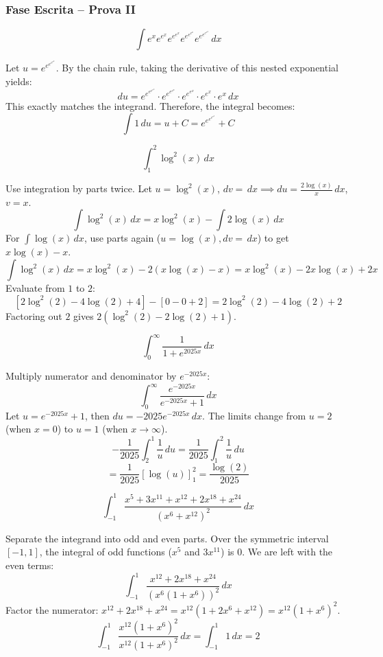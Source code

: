 \subsubsection*{Fase Escrita -- Prova II}
\begin{questions}
    \question \[\int e^x e^{e^x} e^{e^{e^x}} e^{e^{e^{e^x}}} e^{e^{e^{e^{e^x}}}} \,dx\]
    \begin{solution}
        Let $u = e^{e^{e^{e^{e^x}}}}$. By the chain rule, taking the derivative of this nested exponential yields:
        \[du = e^{e^{e^{e^{e^x}}}} \cdot e^{e^{e^{e^x}}} \cdot e^{e^{e^x}} \cdot e^{e^x} \cdot e^x \,dx\]
        This exactly matches the integrand. Therefore, the integral becomes:
        \[\int 1 \,du = u + C = e^{e^{e^{e^{e^x}}}} + C\]
    \end{solution}

    \question \[\int_1^2 \log^2(x) \,dx\]
    \begin{solution}
        Use integration by parts twice. Let $u = \log^2(x)$, $dv = \,dx \implies du = \frac{2\log(x)}{x} \,dx$, $v = x$.
        \[\int \log^2(x) \,dx = x\log^2(x) - \int 2\log(x) \,dx\]
        For $\int \log(x) \,dx$, use parts again ($u=\log(x), dv=\,dx$) to get $x\log(x) - x$.
        \[\int \log^2(x) \,dx = x\log^2(x) - 2(x\log(x) - x) = x\log^2(x) - 2x\log(x) + 2x\]
        Evaluate from $1$ to $2$:
        \[[2\log^2(2) - 4\log(2) + 4] - [0 - 0 + 2] = 2\log^2(2) - 4\log(2) + 2\]
        Factoring out $2$ gives $2(\log^2(2) - 2\log(2) + 1)$.
    \end{solution}

    \question \[\int_0^\infty \frac{1}{1 + e^{2025x}} \,dx\]
    \begin{solution}
        Multiply numerator and denominator by $e^{-2025x}$:
        \[\int_0^\infty \frac{e^{-2025x}}{e^{-2025x} + 1} \,dx\]
        Let $u = e^{-2025x} + 1$, then $du = -2025e^{-2025x} \,dx$. The limits change from $u=2$ (when $x=0$) to $u=1$ (when $x\to\infty$).
        \[-\frac{1}{2025} \int_2^1 \frac{1}{u} \,du = \frac{1}{2025} \int_1^2 \frac{1}{u} \,du\]
        \[= \frac{1}{2025} [\log(u)]_1^2 = \frac{\log(2)}{2025}\]
    \end{solution}

    \question \[\int_{-1}^1 \frac{x^5 + 3x^{11} + x^{12} + 2x^{18} + x^{24}}{(x^6 + x^{12})^2} \,dx\]
    \begin{solution}
        Separate the integrand into odd and even parts. Over the symmetric interval $[-1, 1]$, the integral of odd functions ($x^5$ and $3x^{11}$) is $0$. We are left with the even terms:
        \[\int_{-1}^1 \frac{x^{12} + 2x^{18} + x^{24}}{(x^6(1+x^6))^2} \,dx\]
        Factor the numerator: $x^{12} + 2x^{18} + x^{24} = x^{12}(1 + 2x^6 + x^{12}) = x^{12}(1+x^6)^2$.
        \[\int_{-1}^1 \frac{x^{12}(1+x^6)^2}{x^{12}(1+x^6)^2} \,dx = \int_{-1}^1 1 \,dx = 2\]
    \end{solution}


\end{questions}
